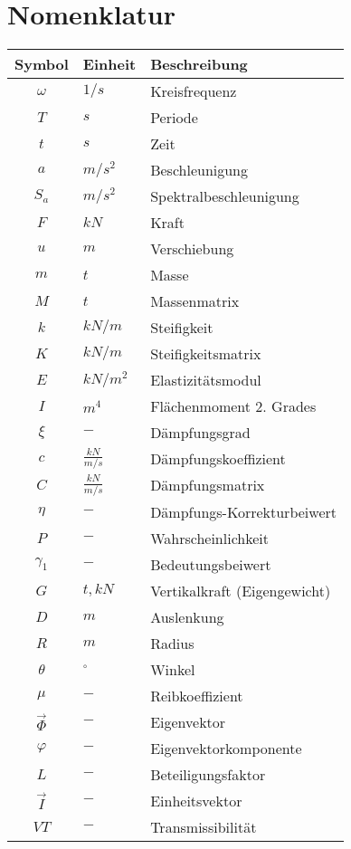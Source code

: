 \cleardoublepage
{}
{}

\chapter*{Nomenklatur}

\begin{longtable}{cp{3cm}p{8cm}}
\hline
Symbol       & Einheit & Beschreibung \\
\hline\hline
$\omega$     & $1/s$   & Kreisfrequenz\\
$T$          & $s$     & Periode      \\
$t$          & $s$     & Zeit         \\
$a$          & $m/s^2$ & Beschleunigung \\
$S_a$        & $m/s^2$ & Spektralbeschleunigung \\
$F$          & $kN$    & Kraft        \\
$u$          & $m$     & Verschiebung \\
$m$          & $t$     & Masse        \\
$M$          & $t$     & Massenmatrix \\
$k$          & $kN/m$  & Steifigkeit  \\
$K$          & $kN/m$  & Steifigkeitsmatrix \\
$E$          & $kN/m^2$& Elastizitätsmodul \\
$I$          & $m^4$   & Flächenmoment 2. Grades \\
$\xi$        & $-$     & Dämpfungsgrad     \\
$c$          & $\frac{kN}{m/s}$     & Dämpfungskoeffizient \\
$C$          & $\frac{kN}{m/s}$     & Dämpfungsmatrix \\
$\eta$       & $-$     & Dämpfungs-Korrekturbeiwert \\
$P$          & $-$     & Wahrscheinlichkeit \\
$\gamma_1$   & $-$     & Bedeutungsbeiwert \\
$G$          & $t, kN$ & Vertikalkraft (Eigengewicht) \\
$D$          & $m$     & Auslenkung \\
$R$          & $m$     & Radius \\
$\theta$     & $^{\circ}$ & Winkel \\
$\mu$        & $-$     & Reibkoeffizient \\
$\vec{\Phi}$ & $-$     & Eigenvektor \\
$\varphi$    & $-$     & Eigenvektorkomponente \\
$L$          & $-$     & Beteiligungsfaktor \\
$\vec{I}$    & $-$     & Einheitsvektor \\
$VT$         & $-$     & Transmissibilität \\
\hline
\end{longtable}



